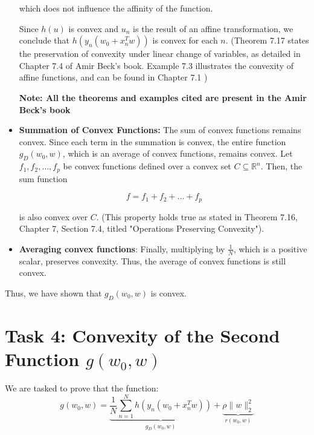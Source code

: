 \documentclass[a4paper,12pt]{report}
\begin{document}
\begin{itemize}
which does not influence the affinity of the function.

Since \( h(u) \) is convex and \( u_n \) is the result of an affine transformation, we conclude that \( h(y_n(w_0 + x_n^T w)) \) is convex for each \( n \). (Theorem 7.17 states the preservation of convexity under linear change of variables, as detailed in Chapter 7.4 of Amir Beck's book.
Example 7.3 illustrates the convexity of affine functions, and can be found in Chapter 7.1 )

\vspace{0.3cm}
\textbf{Note: All the theorems and examples cited are present in the Amir Beck's book}


    
    \item \textbf{Summation of Convex Functions:}  
    The sum of convex functions remains convex. Since each term in the summation is convex, the entire function \( g_D(w_0, w) \), which is an average of convex functions, remains convex.
Let \( f_1, f_2, \ldots, f_p \) be convex functions defined over a convex set \( C \subseteq \mathbb{R}^n \). Then, the sum function 

\begin{equation}
f = f_1 + f_2 + \ldots + f_p
\end{equation}

is also convex over \( C \). (This property holds true as stated in Theorem 7.16, Chapter 7, Section 7.4, titled "Operations Preserving Convexity").

\item \textbf{Averaging convex functions}:  
Finally, multiplying by \( \frac{1}{N} \), which is a positive scalar, preserves convexity. Thus, the average of convex functions is still convex.

\end{itemize}


Thus, we have shown that $g_D(w_0, w)$ is convex.

\section{Task 4: Convexity of the Second Function $g(w_0, w)$}
We are tasked to prove that the function:
\begin{equation}
g(w_0, w) = \underbrace{\frac{1}{N} \sum_{n=1}^{N} h \left(y_n\left(w_0 + x_n^T w\right)\right)}_{g_D(w_0, w)} + \underbrace{\rho \|w\|_2^2}_{r(w_0, w)}
\label{function_g}
\end{equation}
\end{document}
